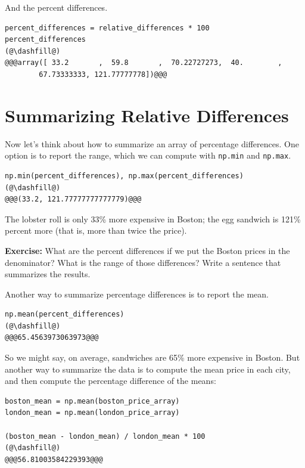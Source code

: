 And the percent differences.

\begin{lstlisting}[]
percent_differences = relative_differences * 100
percent_differences
(@\dashfill@)
@@@array([ 33.2       ,  59.8       ,  70.22727273,  40.        ,
        67.73333333, 121.77777778])@@@
\end{lstlisting}

\hypertarget{summarizing-relative-differences}{%
\section{Summarizing Relative Differences}\label{summarizing-relative-differences}}

Now let's think about how to summarize an array of percentage
differences. One option is to report the range, which we can compute
with \passthrough{\lstinline!np.min!} and
\passthrough{\lstinline!np.max!}.

\begin{lstlisting}[]
np.min(percent_differences), np.max(percent_differences)
(@\dashfill@)
@@@(33.2, 121.77777777777779)@@@
\end{lstlisting}

The lobster roll is only 33\% more expensive in Boston; the egg sandwich
is 121\% percent more (that is, more than twice the price).

\textbf{Exercise:} What are the percent differences if we put the Boston
prices in the denominator? What is the range of those differences? Write
a sentence that summarizes the results.

Another way to summarize percentage differences is to report the mean.

\begin{lstlisting}[]
np.mean(percent_differences)
(@\dashfill@)
@@@65.4563973063973@@@
\end{lstlisting}

So we might say, on average, sandwiches are 65\% more expensive in
Boston. But another way to summarize the data is to compute the mean
price in each city, and then compute the percentage difference of the
means:

\begin{lstlisting}[]
boston_mean = np.mean(boston_price_array)
london_mean = np.mean(london_price_array)

(boston_mean - london_mean) / london_mean * 100
(@\dashfill@)
@@@56.81003584229393@@@
\end{lstlisting}

